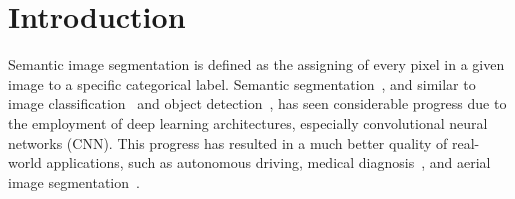 \documentclass[conference,a4paper]{IEEEtran}
\begin{document}
\section{Introduction}
\label{sec:intro}
Semantic image segmentation is defined as the assigning of every pixel in a given image to a specific categorical label. Semantic segmentation~\cite{long2015fully, deeplabv3plus, zhao2017pspnet,deeplabv3}, and similar to image classification~\cite{xie2017aggregated,resnet,szegedy2015going} and object detection~\cite{yolo,lin2017focal}, has seen considerable progress due to the employment of deep learning architectures, especially convolutional neural networks (CNN). This progress has resulted in a much better quality of real-world applications, such as autonomous driving, medical diagnosis~\cite{ronneberger2015u}, and aerial image segmentation~\cite{marmanis2016semantic}. 
\end{document}
